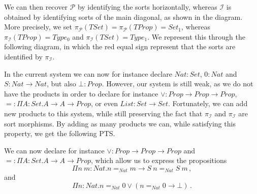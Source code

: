 \documentclass[]{template}
\begin{document}
We can then recover $ \mathcal{P} $ by identifying the sorts horizontally, whereas $ \mathcal{I} $ is obtained by identifying sorts of the main diagonal, as shown in the diagram. More precisely, we set $ \pi_\mathcal{P}(TSet) = \pi_\mathcal{P}(TProp)=Set_1 $, whereas $ \pi_\mathcal{I}(TProp) =  Type_0$ and $\pi_\mathcal{I}(TSet)=Type_1 $. We represent this through the following diagram, in which the red equal sign represent that the sorts are identified by $ \pi_\mathcal{I} $.

\begin{center}
\end{center}

In the current system we can now for instance declare $ Nat : Set $, $ 0 : Nat $ and $ S : Nat \to Nat $, but also $ \bot : Prop $. However, our system is still weak, as we do not have the products in order to declare for instance $ \lor  : Prop \to Prop \to Prop  $, $ = : \Pi A : Set. A \to A \to Prop $, or even $ List : Set \to Set $. Fortunately, we can add new products to this system, while still preserving the fact that $ \pi_\mathcal{I} $ and $ \pi_\mathcal{I} $ are sort morphisms. By adding as many products we can, while satisfying this property, we get the following PTS.

\begin{center}
\end{center}
We can now declare for instance $ \lor  : Prop \to Prop \to Prop  $ and $ = : \Pi A : Set. A \to A \to Prop $, which allow us to express the propositions \[
\Pi n~m : Nat. n =_{Nat} m \to S~n =_{Nat} S~m
  \,,\] and \[
  \Pi n : Nat. n =_{Nat} 0 \lor (n =_{Nat} 0 \to \bot)
  \,.\]
\end{document}
